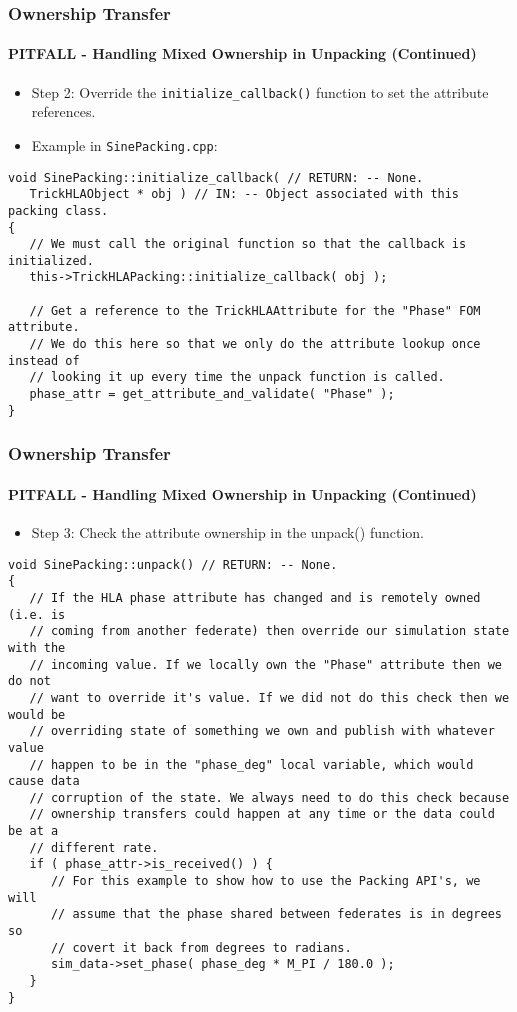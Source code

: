    \begin{frame}[fragile]
      \frametitle{Ownership Transfer}
      \framesubtitle{PITFALL - Handling Mixed Ownership in Unpacking (Continued)}
      \begin{itemize}
         \item Step 2: Override the \texttt{initialize\_callback()} function to
         set the attribute references.
         \item Example in \texttt{SinePacking.cpp}:
      \end{itemize}
\begin{Verbatim}[frame=single, fontsize=\scriptsize]
void SinePacking::initialize_callback( // RETURN: -- None.
   TrickHLAObject * obj ) // IN: -- Object associated with this packing class.
{
   // We must call the original function so that the callback is initialized.
   this->TrickHLAPacking::initialize_callback( obj );

   // Get a reference to the TrickHLAAttribute for the "Phase" FOM attribute.
   // We do this here so that we only do the attribute lookup once instead of
   // looking it up every time the unpack function is called.
   phase_attr = get_attribute_and_validate( "Phase" );
}
\end{Verbatim}
   \end{frame}

   \begin{frame}[fragile]
      \frametitle{Ownership Transfer}
      \framesubtitle{PITFALL - Handling Mixed Ownership in Unpacking (Continued)}
      \begin{itemize}
         \item Step 3: Check the attribute ownership in the unpack() function.
      \end{itemize}
\begin{Verbatim}[frame=single, fontsize=\scriptsize]
void SinePacking::unpack() // RETURN: -- None.
{
   // If the HLA phase attribute has changed and is remotely owned (i.e. is
   // coming from another federate) then override our simulation state with the
   // incoming value. If we locally own the "Phase" attribute then we do not
   // want to override it's value. If we did not do this check then we would be
   // overriding state of something we own and publish with whatever value
   // happen to be in the "phase_deg" local variable, which would cause data
   // corruption of the state. We always need to do this check because
   // ownership transfers could happen at any time or the data could be at a
   // different rate.
   if ( phase_attr->is_received() ) {
      // For this example to show how to use the Packing API's, we will
      // assume that the phase shared between federates is in degrees so
      // covert it back from degrees to radians.
      sim_data->set_phase( phase_deg * M_PI / 180.0 );
   }
}
\end{Verbatim}
   \end{frame}
   
